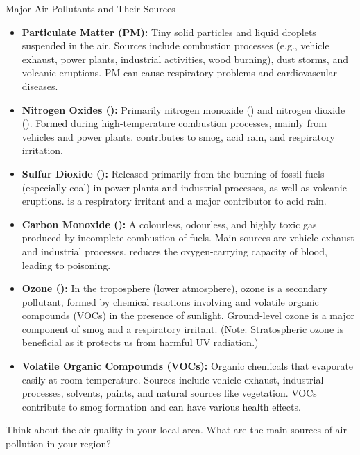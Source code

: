 \begin{keyconcept}{Major Air Pollutants and Their Sources}
\begin{itemize}
    \item \textbf{Particulate Matter (PM):}  Tiny solid particles and liquid droplets suspended in the air.  Sources include combustion processes (e.g., vehicle exhaust, power plants, industrial activities, wood burning), dust storms, and volcanic eruptions.  PM can cause respiratory problems and cardiovascular diseases.
    \item \textbf{Nitrogen Oxides ():}  Primarily nitrogen monoxide () and nitrogen dioxide ().  Formed during high-temperature combustion processes, mainly from vehicles and power plants.   contributes to smog, acid rain, and respiratory irritation.
    \item \textbf{Sulfur Dioxide ():}  Released primarily from the burning of fossil fuels (especially coal) in power plants and industrial processes, as well as volcanic eruptions.   is a respiratory irritant and a major contributor to acid rain.
    \item \textbf{Carbon Monoxide ():}  A colourless, odourless, and highly toxic gas produced by incomplete combustion of fuels.  Main sources are vehicle exhaust and industrial processes.   reduces the oxygen-carrying capacity of blood, leading to poisoning.
    \item \textbf{Ozone ():}  In the troposphere (lower atmosphere), ozone is a secondary pollutant, formed by chemical reactions involving  and volatile organic compounds (VOCs) in the presence of sunlight.  Ground-level ozone is a major component of smog and a respiratory irritant.  (Note: Stratospheric ozone is beneficial as it protects us from harmful UV radiation.)
    \item \textbf{Volatile Organic Compounds (VOCs):}  Organic chemicals that evaporate easily at room temperature.  Sources include vehicle exhaust, industrial processes, solvents, paints, and natural sources like vegetation.  VOCs contribute to smog formation and can have various health effects.
\end{itemize}
\end{keyconcept}

\begin{stopandthink}
Think about the air quality in your local area. What are the main sources of air pollution in your region?
\end{stopandthink}

